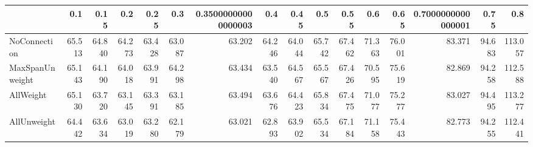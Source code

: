 \begin{tabular}{lrrrrrrrrrrrrrrr}
\toprule
{} &    0.1 &   0.15 &    0.2 &   0.25 &    0.3 & 0.35000000000000003 &    0.4 &   0.45 &    0.5 &   0.55 &    0.6 &   0.65 & 0.7000000000000001 &   0.75 &     0.8 \\
\midrule
NoConnection    & 65.513 & 64.840 & 64.273 & 63.428 & 63.087 &              63.202 & 64.246 & 64.044 & 65.742 & 67.462 & 71.363 & 76.001 &             83.371 & 94.683 & 113.057 \\
MaxSpanUnweight & 65.143 & 64.190 & 64.018 & 63.991 & 64.298 &              63.434 & 63.540 & 64.567 & 65.567 & 67.426 & 70.595 & 75.619 &             82.869 & 94.258 & 112.588 \\
AllWeight       & 65.130 & 63.720 & 63.145 & 63.391 & 63.185 &              63.494 & 63.676 & 64.423 & 65.834 & 67.475 & 71.077 & 75.277 &             83.027 & 94.495 & 113.277 \\
AllUnweight     & 64.442 & 63.634 & 63.019 & 63.280 & 62.179 &              63.021 & 62.893 & 63.902 & 65.534 & 67.184 & 71.158 & 75.443 &             82.773 & 94.255 & 112.441 \\
\bottomrule
\end{tabular}
